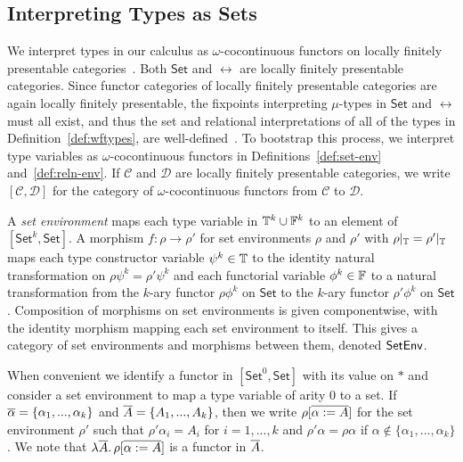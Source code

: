 \documentclass{lmcs}
\theoremstyle{plain}\newtheorem{satz}[thm]{Satz}
\newcommand{\set}{\mathsf{Set}}
\newcommand{\C}{\mathcal{C}}
\newcommand{\D}{\mathcal{D}}
\begin{document}
{\subsection{Interpreting Types as Sets}\label{sec:set-interp}

We interpret types in our calculus as $\omega$-cocontinuous functors
on locally finitely presentable categories~\cite{ar94}. Both $\set$
and $\rel$ are locally finitely presentable categories. Since functor
categories of locally finitely presentable categories are again
locally finitely presentable, the fixpoints interpreting $\mu$-types
in $\set$ and $\rel$ must all exist, and thus the set and relational
interpretations of all of the types in Definition~\ref{def:wftypes},
are well-defined~\cite{jp19}. To bootstrap this process, we interpret
type variables as $\omega$-cocontinuous functors in
Definitions~\ref{def:set-env} and~\ref{def:reln-env}. If $\C$ and $\D$
are locally finitely presentable categories, we write $[\C,\D]$ for
the category of $\omega$-cocontinuous functors from $\C$ to $\D$.

\begin{defi}\label{def:set-env}
A {\em set environment} maps each type variable in $\mathbb{T}^k \cup
\mathbb{F}^k$ to an element of $[\set^k,\set]$.  A morphism $f : \rho \to
\rho'$ for set environments $\rho$ and $\rho'$ with $\rho|_{\mathbb{T}} =
\rho'|_{\mathbb{T}}$ maps each type constructor variable $\psi^k \in \mathbb{T}$
to the identity natural transformation on $\rho \psi^k = \rho'\psi^k$
and each functorial variable $\phi^k \in \mathbb{F}$ to a natural
transformation from the $k$-ary functor $\rho \phi^k$ on $\set$ to the
$k$-ary functor $\rho' \phi^k$ on $\set$.  Composition of morphisms on
set environments is given componentwise, with the identity morphism
mapping each set environment to itself. This gives a category of set
environments and morphisms between them, denoted $\mathsf{SetEnv}$.
\end{defi}
When convenient we identify a functor in $[\set^0, \set]$ with its
value on $\ast$ and consider a set environment to map a type variable
of arity $0$ to a set.  If $\overline{\alpha} = \{\alpha_1,...,\alpha_k\}$
and $\overline{A} = \{A_1,...,A_k\}$, then we write $\rho[\overline{\alpha := A}]$
for the set environment $\rho'$ such that $\rho' \alpha_i = A_i$ for
$i = 1,...,k$ and $\rho' \alpha = \rho \alpha$ if $\alpha \not \in
\{\alpha_1,...,\alpha_k\}$. We note that $\lambda \overline{A}.\,
\rho[\overline{\alpha  := A}]$ is a functor in $\overline{A}$.

}
\end{document}
